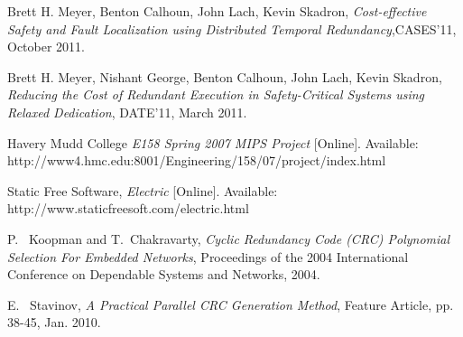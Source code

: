 \documentclass[10pt,journal,compsoc]{IEEEtran}
\begin{document}
\begin{thebibliography}{1}


 Brett H. Meyer, Benton Calhoun, John Lach, Kevin Skadron, \emph{Cost-effective Safety and Fault Localization using Distributed Temporal Redundancy},CASES'11, October 2011.

Brett H. Meyer, Nishant George, Benton Calhoun, John Lach, Kevin Skadron, \emph{Reducing the Cost of Redundant Execution in Safety-Critical Systems using Relaxed Dedication}, DATE'11, March 2011.

Havery Mudd College \emph{E158 Spring 2007 MIPS Project} [Online]. Available: http://www4.hmc.edu:8001/Engineering/158/07/project/index.html

Static Free Software, \emph{Electric} [Online]. Available: http://www.staticfreesoft.com/electric.html

P. ~Koopman and T.~Chakravarty, \emph{Cyclic Redundancy Code ({CRC}) Polynomial Selection For Embedded Networks}, Proceedings of the 2004 International Conference on Dependable Systems and Networks, 2004.

E. ~Stavinov, \emph{A Practical Parallel {CRC} Generation Method}, Feature Article, pp. 38-45, Jan. 2010. 

\end{thebibliography}









\end{document}

